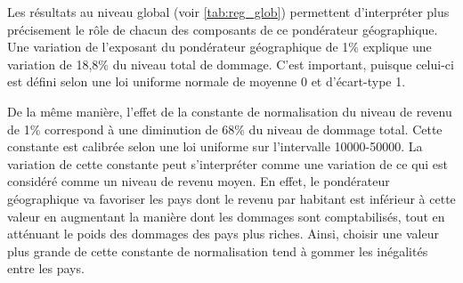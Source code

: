 Les résultats au niveau global (voir \ref{tab:reg_glob}) permettent d'interpréter plus précisement le rôle de chacun des composants de ce pondérateur géographique. Une variation de l'exposant du pondérateur géographique de 1\% explique une variation de 18,8\% du niveau total de dommage. C'est important, puisque celui-ci est défini selon une loi uniforme normale de moyenne 0 et d'écart-type 1.

De la même manière, l'effet de la constante de normalisation du niveau de revenu de 1\% correspond à une diminution de 68\% du niveau de dommage
total. Cette constante est calibrée selon une loi uniforme sur l'intervalle 10000-50000. La variation de cette constante peut s'interpréter comme une variation de ce qui est considéré comme un niveau de revenu moyen. En effet, le pondérateur géographique va favoriser les pays dont le revenu par habitant est inférieur à cette valeur en augmentant la manière dont les dommages sont comptabilisés, tout en atténuant le poids des dommages des pays plus riches. Ainsi, choisir une valeur plus grande de cette constante de normalisation tend à gommer les inégalités entre les pays. 

